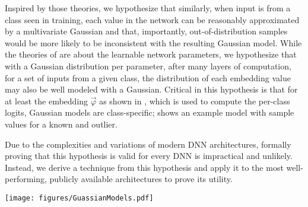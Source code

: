 Inspired by those theories, we hypothesize that similarly, when input is from a class seen in training, each value in the network can be reasonably approximated by a multivariate Gaussian and that, importantly, out-of-distribution samples would be more likely to be inconsistent with the resulting Gaussian model.  
While the theories of \citet{sirignano2020mean,lu2020mean} are about the learnable network parameters, we hypothesize that with a Gaussian distribution per parameter, after many layers of computation, for a set of inputs from a given class, the distribution of each embedding value may also be well modeled with a Gaussian. 
Critical in this hypothesis is that for at least the embedding $\vec\varphi$ as shown in , which is used to compute the per-class logits, Gaussian models are class-specific;   shows an example model with sample values for a known and outlier. 

Due to the complexities and variations of modern DNN architectures, formally proving that this hypothesis is valid for every DNN is impractical and unlikely.  Instead, we derive a technique from this hypothesis and apply it to the most well-performing, publicly available architectures to prove its utility.





\begin{figure*}[bth]
    \centerline{\texttt{[image: figures/GuassianModels.pdf]}}
\end{figure*}

